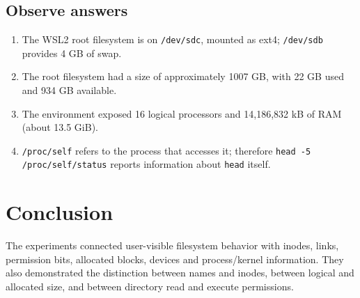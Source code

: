 \documentclass[12pt,a4paper]{article}
\begin{document}
\subsection{Observe answers}
\begin{enumerate}[label=\arabic*.]
\item The WSL2 root filesystem is on \texttt{/dev/sdc}, mounted as ext4; \texttt{/dev/sdb} provides 4 GB of swap.
\item The root filesystem had a size of approximately 1007 GB, with 22 GB used and 934 GB available.
\item The environment exposed 16 logical processors and 14,186,832 kB of RAM (about 13.5 GiB).
\item \texttt{/proc/self} refers to the process that accesses it; therefore \texttt{head -5 /proc/self/status} reports information about \texttt{head} itself.
\end{enumerate}

\section{Conclusion}
The experiments connected user-visible filesystem behavior with inodes, links, permission bits, allocated blocks, devices and process/kernel information. They also demonstrated the distinction between names and inodes, between logical and allocated size, and between directory read and execute permissions.
\end{document}
